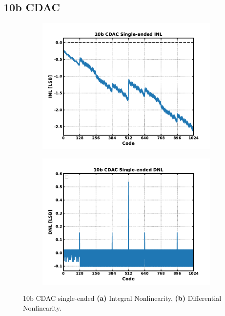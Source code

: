 \subsection{10b CDAC}\label{sec:res_cdac_10b}

	\begin{figure}[htb!]
	    \centering
	    \begin{subfigure}{0.5\textwidth}
	        \centering
	        \includegraphics[width=1\textwidth, angle=0]{./figs/results/10b_cdac_se_inl}
	        \caption{ }
	        \label{fig:10b_cdac_se_inl}
	    \end{subfigure}%
	    \begin{subfigure}{0.5\textwidth}
	        \centering
	        \includegraphics[width=1\textwidth, angle=0]{./figs/results/10b_cdac_se_dnl}
	        \caption{ }
	        \label{fig:10b_cdac_se_dnl}
	    \end{subfigure}
	    \label{fig:10b_cdac_se_nonlinearity}
	    \caption{10b CDAC single-ended \textbf{(a)} Integral Nonlinearity, \textbf{(b)} Differential Nonlinearity.}
	\end{figure} 



